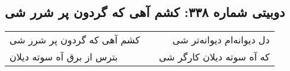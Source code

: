 \begin{center}
\section*{دوبیتی شماره ۳۳۸: کشم آهی که گردون پر شرر شی}
\label{sec:338}
\begin{longtable}{l p{0.5cm} r}
کشم آهی که گردون پر شرر شی
&&
دل دیوانه‌ام دیوانه‌تر شی
\\
بترس از برق آه سوته دیلان
&&
که آه سوته دیلان کارگر شی
\\
\end{longtable}
\end{center}
